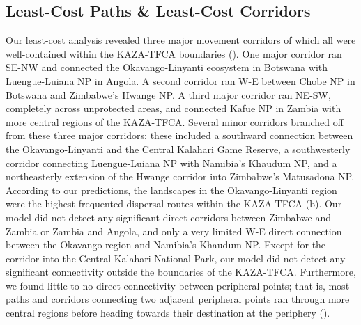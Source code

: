 \documentclass[abstract=on,10pt,a4paper,bibliography=totocnumbered]{article}
\begin{document}
\subsection{Least-Cost Paths \& Least-Cost Corridors}
Our least-cost analysis revealed three major movement corridors of which all
were well-contained within the KAZA-TFCA boundaries (). One
major corridor ran SE-NW and connected the Okavango-Linyanti ecosystem in
Botswana with Luengue-Luiana NP in Angola. A second corridor ran W-E between
Chobe NP in Botswana and Zimbabwe's Hwange NP. A third major corridor ran NE-SW,
completely across unprotected areas, and connected Kafue NP in Zambia with more
central regions of the KAZA-TFCA. Several minor corridors branched off from
these three major corridors; these included a southward connection between the
Okavango-Linyanti and the Central Kalahari Game Reserve, a southwesterly
corridor connecting Luengue-Luiana NP with Namibia's Khaudum NP, and a
northeasterly extension of the Hwange corridor into Zimbabwe's Matusadona NP.
According to our predictions, the landscapes in the Okavango-Linyanti region
were the highest frequented dispersal routes within the KAZA-TFCA
(b). Our model did not detect any significant direct corridors
between Zimbabwe and Zambia or Zambia and Angola, and only a very limited W-E
direct connection between the Okavango region and Namibia's Khaudum NP. Except
for the corridor into the Central Kalahari National Park, our model did not
detect any significant connectivity outside the boundaries of the KAZA-TFCA.
Furthermore, we found little to no direct connectivity between peripheral
points; that is, most paths and corridors connecting two adjacent peripheral
points ran through more central regions before heading towards their destination
at the periphery ().
\end{document}
